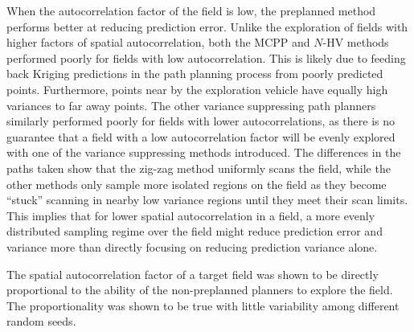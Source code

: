 When the autocorrelation factor of the field is low, the preplanned method performs better at reducing prediction error. Unlike the exploration of fields with higher factors of spatial autocorrelation, both the MCPP and $N$-HV methods performed poorly for fields with low autocorrelation. This is likely due to feeding back Kriging predictions in the path planning process from poorly predicted points. Furthermore, points near by the exploration vehicle have equally high variances to far away points. The other variance suppressing path planners similarly performed poorly for fields with lower autocorrelations, as there is no guarantee that a field with a low autocorrelation factor will be evenly explored with one of the variance suppressing methods introduced. The differences in the paths taken show that the zig-zag method uniformly scans the field, while the other methods only sample more isolated regions on the field as they become ``stuck'' scanning in nearby low variance regions until they meet their scan limits. This implies that for lower spatial autocorrelation in a field, a more evenly distributed sampling regime over the field might reduce prediction error and variance more than directly focusing on reducing prediction variance alone.

The spatial autocorrelation factor of a target field was shown to be directly proportional to the ability of the non-preplanned planners to explore the field. The proportionality was shown to be true with little variability among different random seeds.


